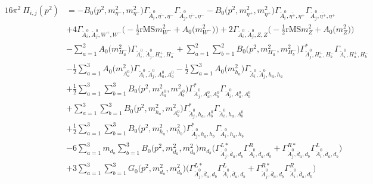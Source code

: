\begin{itemize}
\begin{align} 
16\pi^2 \ \Pi_{i,j}(p^2) &= - {B_0\Big(p^{2},m^2_{\eta^-},m^2_{\eta^-}\Big)} {\Gamma_{\check{A}^0_{{i}},\bar{\eta^-},\eta^-}} {\Gamma_{\check{A}^0_{{j}},\bar{\eta^-},\eta^-}} - {B_0\Big(p^{2},m^2_{\eta^+},m^2_{\eta^+}\Big)} {\Gamma_{\check{A}^0_{{i}},\bar{\eta^+},\eta^+}} {\Gamma_{\check{A}^0_{{j}},\bar{\eta^+},\eta^+}} \nonumber \\ 
 &+4 {\Gamma_{\check{A}^0_{{i}},\check{A}^0_{{j}},W^+,W^-}} \Big(-\frac{1}{2} \text{rMS} m^2_{W^-}  + {A_0\Big(m^2_{W^-}\Big)}\Big)+2 {\Gamma_{\check{A}^0_{{i}},\check{A}^0_{{j}},Z,Z}} \Big(-\frac{1}{2} \text{rMS} m^2_{Z}  + {A_0\Big(m^2_{Z}\Big)}\Big)\nonumber \\ 
 &- \sum_{a=1}^{2}{A_0\Big(m^2_{H^-_{{a}}}\Big)} {\Gamma_{\check{A}^0_{{i}},\check{A}^0_{{j}},H^+_{{a}},H^-_{{a}}}}  +\sum_{a=1}^{2}\sum_{b=1}^{2}{B_0\Big(p^{2},m^2_{H^-_{{a}}},m^2_{H^-_{{b}}}\Big)} {\Gamma^*_{\check{A}^0_{{j}},H^+_{{a}},H^-_{{b}}}} {\Gamma_{\check{A}^0_{{i}},H^+_{{a}},H^-_{{b}}}} \nonumber \\ 
 &-\frac{1}{2} \sum_{a=1}^{3}{A_0\Big(m^2_{A^0_{{a}}}\Big)} {\Gamma_{\check{A}^0_{{i}},\check{A}^0_{{j}},A^0_{{a}},A^0_{{a}}}}  -\frac{1}{2} \sum_{a=1}^{3}{A_0\Big(m^2_{h_{{a}}}\Big)} {\Gamma_{\check{A}^0_{{i}},\check{A}^0_{{j}},h_{{a}},h_{{a}}}}  \nonumber \\ 
 &+\frac{1}{2} \sum_{a=1}^{3}\sum_{b=1}^{3}{B_0\Big(p^{2},m^2_{A^0_{{a}}},m^2_{A^0_{{b}}}\Big)} {\Gamma^*_{\check{A}^0_{{j}},A^0_{{a}},A^0_{{b}}}} {\Gamma_{\check{A}^0_{{i}},A^0_{{a}},A^0_{{b}}}}  \nonumber \\ 
 &+\sum_{a=1}^{3}\sum_{b=1}^{3}{B_0\Big(p^{2},m^2_{h_{{a}}},m^2_{A^0_{{b}}}\Big)} {\Gamma^*_{\check{A}^0_{{j}},h_{{a}},A^0_{{b}}}} {\Gamma_{\check{A}^0_{{i}},h_{{a}},A^0_{{b}}}} \nonumber \\ 
 &+\frac{1}{2} \sum_{a=1}^{3}\sum_{b=1}^{3}{B_0\Big(p^{2},m^2_{h_{{a}}},m^2_{h_{{b}}}\Big)} {\Gamma^*_{\check{A}^0_{{j}},h_{{a}},h_{{b}}}} {\Gamma_{\check{A}^0_{{i}},h_{{a}},h_{{b}}}}  \nonumber \\ 
 &-6 \sum_{a=1}^{3}m_{d_{{a}}} \sum_{b=1}^{3}{B_0\Big(p^{2},m^2_{d_{{a}}},m^2_{d_{{b}}}\Big)} m_{d_{{b}}} \Big({\Gamma^{L*}_{\check{A}^0_{{j}},\bar{d}_{{a}},d_{{b}}}} {\Gamma^R_{\check{A}^0_{{i}},\bar{d}_{{a}},d_{{b}}}}  + {\Gamma^{R*}_{\check{A}^0_{{j}},\bar{d}_{{a}},d_{{b}}}} {\Gamma^L_{\check{A}^0_{{i}},\bar{d}_{{a}},d_{{b}}}} \Big)  \nonumber \\ 
 &+3 \sum_{a=1}^{3}\sum_{b=1}^{3}{G_0\Big(p^{2},m^2_{d_{{a}}},m^2_{d_{{b}}}\Big)} \Big({\Gamma^{L*}_{\check{A}^0_{{j}},\bar{d}_{{a}},d_{{b}}}} {\Gamma^L_{\check{A}^0_{{i}},\bar{d}_{{a}},d_{{b}}}}  + {\Gamma^{R*}_{\check{A}^0_{{j}},\bar{d}_{{a}},d_{{b}}}} {\Gamma^R_{\check{A}^0_{{i}},\bar{d}_{{a}},d_{{b}}}} \Big) \nonumber \\ 

\end{align}
\end{itemize}
